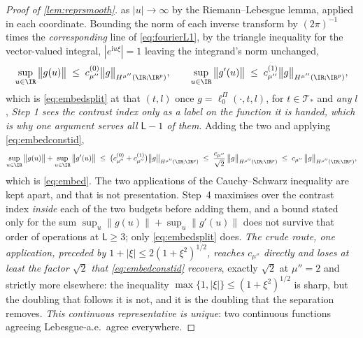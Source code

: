 \begin{proof}[Proof of \cref{lem:reprsmooth}]
as $|u|\to\infty$ by the Riemann--Lebesgue lemma, applied in each coordinate. Bounding the norm of each
inverse transform by $(2\pi)^{-1}$ times the \emph{corresponding} line of \eqref{eq:fourierL1}, by the
triangle inequality for the vector-valued integral, $|e^{\mathrm iu\xi}|=1$ leaving the integrand's norm
unchanged, 
\[
\sup_{u\in\IR}\big\|g(u)\big\|\;\le\;c^{(0)}_{\mu''}\big\|g\big\|_{H^{\mu''}(\IR;\IR^{p})},
\qquad
\sup_{u\in\IR}\big\|g'(u)\big\|\;\le\;c^{(1)}_{\mu''}\big\|g\big\|_{H^{\mu''}(\IR;\IR^{p})},
\]
which is \eqref{eq:embedsplit} at that $(t,l)$ once $g=\ell^\Pi_0(\cdot,t,l)$, for
$t\in\mathcal T_\ast$ and \emph{any} $l$, \emph{Step 1 sees the contrast index only as a label on the
function it is handed, which is why one argument serves all $\mathsf L-1$ of them}.
Adding the two and applying \eqref{eq:embedconstid},
\[
\sup_{u\in\IR}\big\|g(u)\big\|+\sup_{u\in\IR}\big\|g'(u)\big\|
\;\le\;\big(c^{(0)}_{\mu''}+c^{(1)}_{\mu''}\big)\big\|g\big\|_{H^{\mu''}(\IR;\IR^{p})}
\;\le\;\frac{c_{\mu''}}{\sqrt2}\,\big\|g\big\|_{H^{\mu''}(\IR;\IR^{p})}
\;\le\;c_{\mu''}\,\big\|g\big\|_{H^{\mu''}(\IR;\IR^{p})} ,
\]
which is \eqref{eq:embed}.
The two applications of the Cauchy--Schwarz inequality are kept apart, and that is not
presentation. Step~4 maximises over the contrast index \emph{inside} each of the two budgets before
adding them, and a bound stated only for the sum $\sup_u\|g(u)\|+\sup_u\|g'(u)\|$ does not survive that
order of operations at $\mathsf L\ge3$; only \eqref{eq:embedsplit} does. \emph{The crude route, one
application, preceded by $1+|\xi|\le2(1+\xi^{2})^{1/2}$, reaches $c_{\mu''}$ directly and loses at
least the factor $\sqrt2$ that \eqref{eq:embedconstid} recovers}, exactly $\sqrt2$ at $\mu''=2$ and
strictly more elsewhere: the inequality $\max\{1,|\xi|\}\le(1+\xi^{2})^{1/2}$ is sharp, but the doubling
that follows it is not, and it is the doubling that the separation removes.
\emph{This continuous representative is unique}: two continuous functions agreeing Lebesgue-a.e.\ agree
everywhere.


\end{proof}
